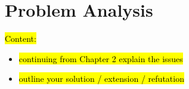 \newpage
\section{Problem Analysis}
\hl{Content:}
\begin{itemize}
    \item \hl{continuing from Chapter 2 explain the issues}
    \item \hl{outline your solution / extension / refutation}
\end{itemize}


